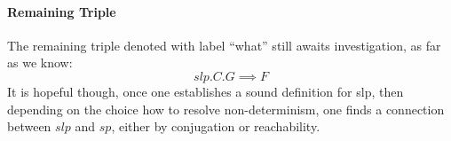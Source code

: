 \paragraph{Remaining Triple}
The remaining triple denoted with label ``what'' still awaits investigation, as far as we know: 
$$slp.C.G\implies F$$
It is hopeful though, once one establishes a sound definition for slp, then depending on the choice how to resolve non-determinism, one finds a connection between $slp$ and $sp$, either by conjugation or reachability. 



